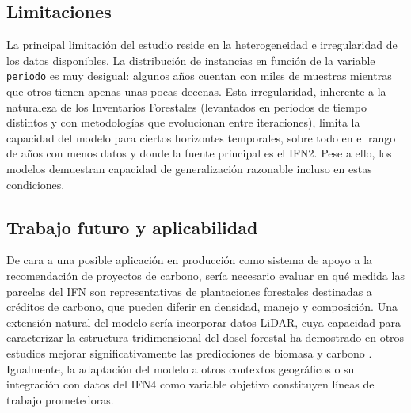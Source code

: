 \subsection*{Limitaciones}

La principal limitación del estudio reside en la heterogeneidad e irregularidad de los datos disponibles. La distribución de instancias en función de la variable \texttt{periodo} es muy desigual: algunos años cuentan con miles de muestras mientras que otros tienen apenas unas pocas decenas. Esta irregularidad, inherente a la naturaleza de los Inventarios Forestales (levantados en periodos de tiempo distintos y con metodologías que evolucionan entre iteraciones), limita la capacidad del modelo para ciertos horizontes temporales, sobre todo en el rango de años con menos datos y donde la fuente principal es el IFN2. Pese a ello, los modelos demuestran capacidad de generalización razonable incluso en estas condiciones.

\subsection*{Trabajo futuro y aplicabilidad}

De cara a una posible aplicación en producción como sistema de apoyo a la recomendación de proyectos de carbono, sería necesario evaluar en qué medida las parcelas del IFN son representativas de plantaciones forestales destinadas a créditos de carbono, que pueden diferir en densidad, manejo y composición. Una extensión natural del modelo sería incorporar datos LiDAR, cuya capacidad para caracterizar la estructura tridimensional del dosel forestal ha demostrado en otros estudios mejorar significativamente las predicciones de biomasa y carbono \citep{nyakudanga_treemes}. Igualmente, la adaptación del modelo a otros contextos geográficos o su integración con datos del IFN4 como variable objetivo constituyen líneas de trabajo prometedoras.
